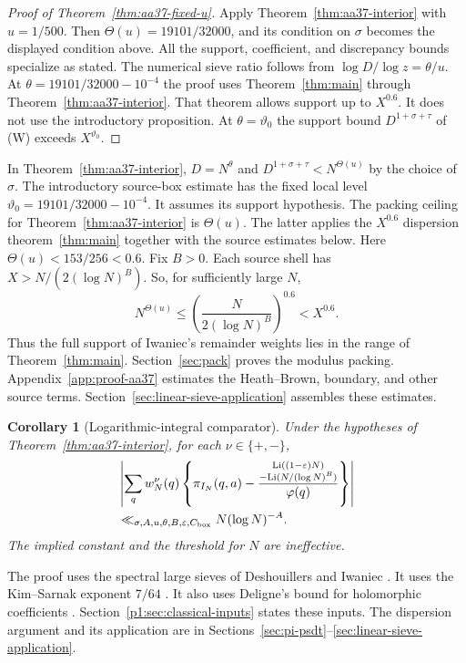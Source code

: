 \documentclass{amsart}
\DeclareMathOperator{\Li}{Li}
\newtheorem{corollary}[theorem]{Corollary}
\numberwithin{equation}{section}
\theoremstyle{definition}
\theoremstyle{plain}
\begin{document}
\begin{proof}[Proof of Theorem~\ref{thm:aa37-fixed-u}]
Apply Theorem~\ref{thm:aa37-interior} with $u=1/500$.
Then $\Theta(u)=19101/32000$, and its condition on $\sigma$ becomes
the displayed condition above. All the support, coefficient,
and discrepancy bounds specialize as stated. The numerical sieve
ratio follows from $\log D/\log z=\theta/u$.
At $\theta=19101/32000-10^{-4}$ the proof uses Theorem~\ref{thm:main}
through Theorem~\ref{thm:aa37-interior}. That theorem allows support
up to $X^{0.6}$.
It does not use the introductory proposition. At $\theta=\vartheta_0$
the support bound $D^{1+\sigma+\tau}$ of \textup{(W)} exceeds $X^{\vartheta_0}$.
\end{proof}

In Theorem~\ref{thm:aa37-interior}, $D=N^\theta$ and
$D^{1+\sigma+\tau}<N^{\Theta(u)}$ by the choice of $\sigma$.
The introductory source-box estimate has the fixed local level
$\vartheta_0=19101/32000-10^{-4}$. It assumes its support hypothesis. The packing ceiling for Theorem~\ref{thm:aa37-interior}
is $\Theta(u)$. The latter applies the $X^{0.6}$
dispersion theorem~\ref{thm:main} together with the source estimates
below. Here $\Theta(u)<153/256<0.6$. Fix $B>0$. Each source shell has
$X>N/(2(\log N)^B)$. So, for sufficiently large $N$,
\[
 N^{\Theta(u)}\le\left(\frac{N}{2(\log N)^B}\right)^{0.6}<X^{0.6}.
\]
Thus the full support of Iwaniec's remainder weights lies in the range of
Theorem~\ref{thm:main}. Section~\ref{sec:pack} proves the modulus
packing. Appendix~\ref{app:proof-aa37} estimates the Heath--Brown,
boundary, and other source terms. Section~\ref{sec:linear-sieve-application}
assembles these estimates.

\begin{corollary}[Logarithmic-integral comparator]
\label{cor:aa37-interior-li}
Under the hypotheses of Theorem~\ref{thm:aa37-interior}, for each
$\nu\in\{+,-\}$,
\[
 \begin{aligned}
 &\left|\sum_q w_N^\nu(q)
  \left\{\pi_{I_N}(q,a)-
  \frac{\substack{\Li((1-\varepsilon)N)\\
                   {}-\Li(N/(\log N)^B)}}
       {\varphi(q)}\right\}\right|\\
 &\ll_{\sigma,A,u,\theta,B,\varepsilon,C_{\rm box}} N(\log N)^{-A}.
 \end{aligned}
\]
The implied constant and the threshold for $N$ are ineffective.
\end{corollary}

The proof uses the spectral large sieves of Deshouillers and Iwaniec
\cite{DI82}. It uses the Kim--Sarnak exponent $7/64$ \cite{KS03}.
It also uses Deligne's bound for holomorphic coefficients
\cite{Deligne74}. Section~\ref{p1:sec:classical-inputs} states these
inputs. The dispersion argument and its application are in
Sections~\ref{sec:pi-psdt}--\ref{sec:linear-sieve-application}.
\end{document}
